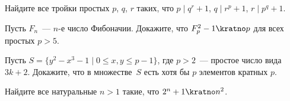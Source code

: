


\begin{problems}

\item
Найдите все тройки простых $p$, $q$, $r$ таких, что
$p \mid q^{r} + 1$,\enspace
$q \mid r^{p} + 1$,\enspace
$r \mid p^{q} + 1$.

\item
Пусть $F_{n}$~--- $n$-е число Фибоначии.
Докажите, что $F_{p}^2 - 1 \kratno p$ для всех простых $p > 5$.

\item
Пусть $S = \{ y^2 - x^3 - 1 \; | \; 0 \leq x, y \leq p - 1 \}$,
где $p > 2$~--- простое число вида $3 k + 2$.
Докажите, что в множестве~$S$ есть хотя бы $p$ элементов кратных $p$.

\item
Найдите все натуральные $n>1$ такие, что $2^{n} + 1 \kratno n^2$.

\end{problems}

